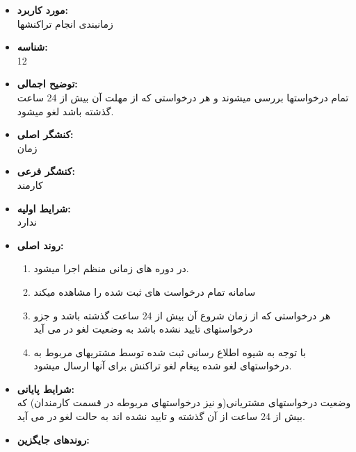 \documentclass{article}
\begin{document}
\begin{itemize}
\item \textbf{مورد کاربرد:}\\
زمانبندی انجام تراکنشها
\item \textbf{شناسه:}\\
12
\item \textbf{توضیح اجمالی:}\\
تمام درخواستها بررسی میشوند و هر درخواستی که از مهلت آن بیش از 24 ساعت گذشته باشد لغو میشود.
\item \textbf{کنشگر اصلی:}\\
زمان
\item \textbf{کنشگر فرعی:}\\
کارمند
\item \textbf{شرایط اولیه:}\\
ندارد
\item \textbf{روند اصلی:}\\
\begin{enumerate}
\item در دوره های زمانی منظم اجرا میشود.
\item سامانه تمام درخواست های ثبت شده را مشاهده میکند
\item هر درخواستی که از زمان شروع آن بیش از 24 ساعت گذشته باشد و جزو درخواستهای تایید نشده باشد به وضعیت لغو در می آید
\item  با توجه به شیوه اطلاع رسانی ثبت شده توسط مشتریهای مربوط به درخواستهای لغو شده پیغام لغو تراکنش برای آنها ارسال میشود.

\end{enumerate}

\item \textbf{شرایط پایانی:}\\ 
وضعیت درخواستهای مشتریانی(و نیز درخواستهای مربوطه در قسمت کارمندان) که بیش از 24 ساعت از آن گذشته و تایید نشده اند به حالت لغو در می آید.\\
\item \textbf{روندهای جایگزین:}\\

\end{itemize}

\noindent\makebox[\linewidth]{\rule{\paperwidth}{0.4pt}}
\end{document}
